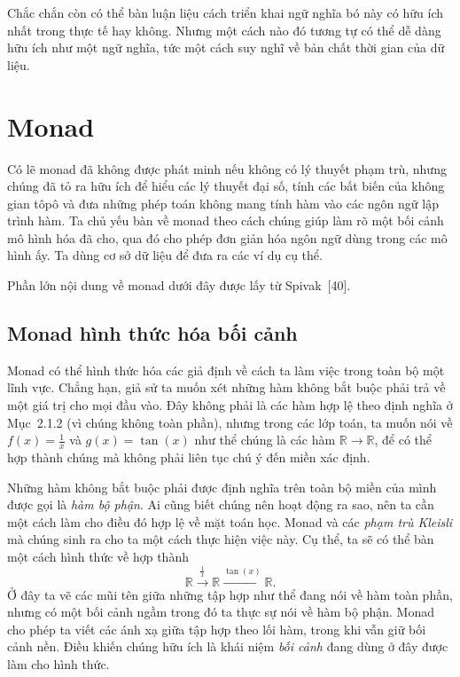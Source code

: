 Chắc chắn còn có thể bàn luận liệu cách triển khai ngữ nghĩa bó này có hữu ích nhất trong thực tế hay không. Nhưng một cách nào đó tương tự có thể dễ dàng hữu ích như một ngữ nghĩa, tức một cách suy nghĩ về bản chất thời gian của dữ liệu.

\section{Monad}
Có lẽ monad đã không được phát minh nếu không có lý thuyết phạm trù, nhưng chúng đã tỏ ra hữu ích để hiểu các lý thuyết đại số, tính các bất biến của không gian tôpô và đưa những phép toán không mang tính hàm vào các ngôn ngữ lập trình hàm. Ta chủ yếu bàn về monad theo cách chúng giúp làm rõ một bối cảnh mô hình hóa đã cho, qua đó cho phép đơn giản hóa ngôn ngữ dùng trong các mô hình ấy. Ta dùng cơ sở dữ liệu để đưa ra các ví dụ cụ thể.

Phần lớn nội dung về monad dưới đây được lấy từ Spivak~[40].

\subsection{Monad hình thức hóa bối cảnh}
Monad có thể hình thức hóa các giả định về cách ta làm việc trong toàn bộ một lĩnh vực. Chẳng hạn, giả sử ta muốn xét những hàm không bắt buộc phải trả về một
giá trị cho mọi đầu vào. Đây không phải là các hàm hợp lệ theo định nghĩa ở Mục~2.1.2 (vì chúng không toàn phần), nhưng trong các lớp toán, ta muốn nói về $f(x)=\frac1x$ và $g(x)=\tan(x)$ như thể chúng là các hàm $\mathbb R\to\mathbb R$, để có thể hợp thành chúng mà không phải liên tục chú ý đến miền xác định.

Những hàm không bắt buộc phải được định nghĩa trên toàn bộ miền của mình được gọi là \emph{hàm bộ phận}. Ai cũng biết chúng nên hoạt động ra sao, nên ta cần một cách làm cho điều đó hợp lệ về mặt toán học. Monad và các \emph{phạm trù Kleisli} mà chúng sinh ra cho ta một cách thực hiện việc này. Cụ thể, ta sẽ có thể bàn một cách hình thức về hợp thành
\[
\mathbb R\xrightarrow{\frac1x}\mathbb R\xrightarrow{\tan(x)}\mathbb R.
\]
Ở đây ta vẽ các mũi tên giữa những tập hợp như thể đang nói về hàm toàn phần, nhưng có một bối cảnh ngầm trong đó ta thực sự nói về hàm bộ phận. Monad cho phép ta viết các ánh xạ giữa tập hợp theo lối hàm, trong khi vẫn giữ bối cảnh nền. Điều khiến chúng hữu ích là khái niệm \emph{bối cảnh} đang dùng ở đây được làm cho hình thức.

